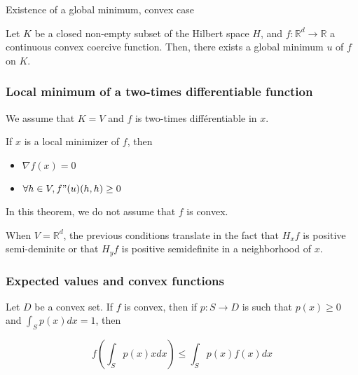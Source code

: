\documentclass[
10pt, %
a4paper, %
oneside, %
headinclude,footinclude, %
BCOR5mm, %
]{scrartcl}
\begin{document}
\begin{theorem}{Existence of a global minimum, convex case}
    \label{th:alphaconv}

    Let $K$ be a closed non-empty subset of the Hilbert space $H$, and $f: \mathbb{R}^d\rightarrow \mathbb{R} $ a continuous convex coercive function. Then, there exists a global minimum $u$ of $f$ on $K$.

\end{theorem}

\subsubsection{\large\color{Periwinkle}Local minimum of a two-times differentiable function}

\begin{theorem}
    
We assume that $K=V$ and $f$ is two-times différentiable in $x$.

If $x$ is a local minimizer of $f$, then
\begin{itemize}
    \item $\nabla f(x)=0$
    \item $\forall h\in V, f"(u)(h,h)\geq 0$
\end{itemize}


\end{theorem}

\begin{remark}
    
    In this theorem, we do not assume that $f$ is convex.
\end{remark}

\begin{remark}
   When  $V= \mathbb{R}^d$, the previous conditions translate in the fact that $H_xf$ is positive semi-deminite or that $H_yf$ is positive semidefinite in a neighborhood of $x$. 
\end{remark}


\subsubsection{\large\color{Periwinkle}Expected values and convex functions}

Let $D$ be a convex set. If $f$ is convex, then if $p: S\rightarrow D$ is such that $p(x)\geq 0$ and $ \int_{S} p(x)  dx =1$, then

\begin{equation*}
    f( \int_{S} p(x)x  dx)\leq \int_{S} p(x)f(x)  dx
\end{equation*}
\end{document}
